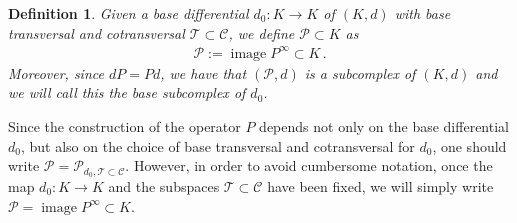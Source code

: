 \documentclass[10pt]{amsart}
\newcounter{dummy} \numberwithin{dummy}{section}
\newtheorem{definition}[dummy]{Definition}
\theoremstyle{remark}
\newcommand{\calP}{\mathcal{P}}
\DeclareMathOperator{\image}{image}
\numberwithin{equation}{section}
\begin{document}
\begin{definition}
    Given a base differential $d_0\colon K\to K$ of $(K,d)$ with base transversal and cotransversal $\mathcal{T}\subset\mathcal{C}$, we define $\mathcal{P}\subset K$ as
    \begin{align*}
        \mathcal{P}:=\image P^\infty\subset K\,.
    \end{align*}
    Moreover, since $dP=Pd$, we have that $(\calP,d)$ is a subcomplex of $(K,d)$ and we will call this \emph{the base subcomplex} of $d_0$.
\end{definition}
Since the construction of the operator $P$ depends not only on the base differential $d_0$, but also on the choice of base transversal and cotransversal for $d_0$, one should write $\mathcal{P}=\mathcal{P}_{d_0,\mathcal{T}\subset\mathcal{C}}$. However, in order to avoid cumbersome notation, once the map $d_0\colon K\to K$ and the subspaces $\mathcal{T}\subset\mathcal{C}$ have been fixed, we will simply write $\mathcal{P}=\image P^\infty\subset K$.
\end{document}
